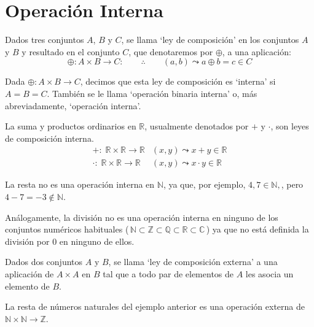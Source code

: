 \section{Operación Interna}
\begin{defi}
Dados tres conjuntos $A$, $B$ y $C$, se llama `ley de composición' en los conjuntos $A$ y $B$ y resultado en el conjunto $C$, que denotaremos por $\oplus$, a una aplicación: 
\begin{equation*}
	\oplus: A \times B \longrightarrow C: \qquad \therefore \qquad (a,b) \leadsto a \oplus b = c \in C
\end{equation*}	
\end{defi}
\begin{defi}
Dada $\oplus: A \times B \to C$, decimos que esta ley de composición es `interna' si $A=B=C$. También se le llama `operación binaria interna' o, más abreviadamente, `operación interna'.
\end{defi}
\begin{ejem}
La suma y productos ordinarios en $\mathbb R$, usualmente denotados por $+$ y $\cdot$, son leyes de composición interna.
\begin{equation*}
	\begin{split} 
		+:\; \mathbb R \times \mathbb R \longrightarrow \mathbb R & (x,y) \leadsto x+y \in \mathbb R \\
		\cdot : \;  \mathbb R \times \mathbb R \longrightarrow \mathbb R & (x,y) \leadsto x \cdot y \in \mathbb R
	\end{split}
\end{equation*}	
\end{ejem}
\begin{ejem}
La resta no es una operación interna en $ \mathbb N$, ya que, por ejemplo, $4,7 \in  \mathbb N,$, pero $4-7=-3 \notin  \mathbb N$.

Análogamente, la división no es una operación interna en ninguno de los conjuntos numéricos habituales ($\, \mathbb N \subset \mathbb Z \subset \mathbb Q \subset \mathbb R \subset \mathbb C\,$) ya que no está definida la división por $0$ en ninguno de ellos.
\end{ejem}
\begin{defi}
Dados dos conjuntos $A$ y $B$, se llama `ley de composición externa' a una aplicación de $A\times A$ en $B$ tal que a todo par de elementos de $A$ les asocia un elemento de $B$.	
\end{defi}
\begin{ejem}
La resta de números naturales del ejemplo anterior es una operación externa de $\mathbb N \times \mathbb N \to \mathbb Z$.	
\end{ejem}
